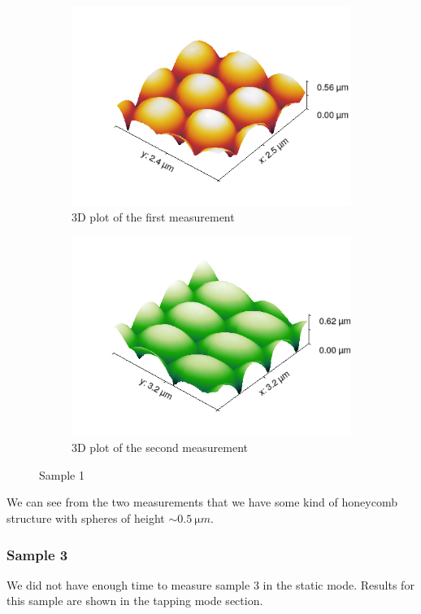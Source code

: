 \documentclass[11pt,a4paper]{article}
\begin{document}
\begin{figure}[H]
\begin{subfigure}[b]{0.45\textwidth}
\includegraphics[width=\textwidth]{sm_sample1_3D}
\caption{3D plot of the first measurement}
\label{fig:}
\end{subfigure}
\begin{subfigure}[b]{0.45\textwidth}
\includegraphics[width=\textwidth]{sm_sample1_dir2_3D}
\caption{3D plot of the second measurement}
\label{fig:}
\end{subfigure}
\caption{Sample 1}
\end{figure}

We can see from the two measurements that we have some kind of honeycomb structure with spheres of height $\sim\SI{0.5}{\micro m}$.

\newpage
\subsubsection{Sample 3}
We did not have enough time to measure sample 3 in the static mode. Results for this sample are shown in the tapping mode section.
\end{document}
